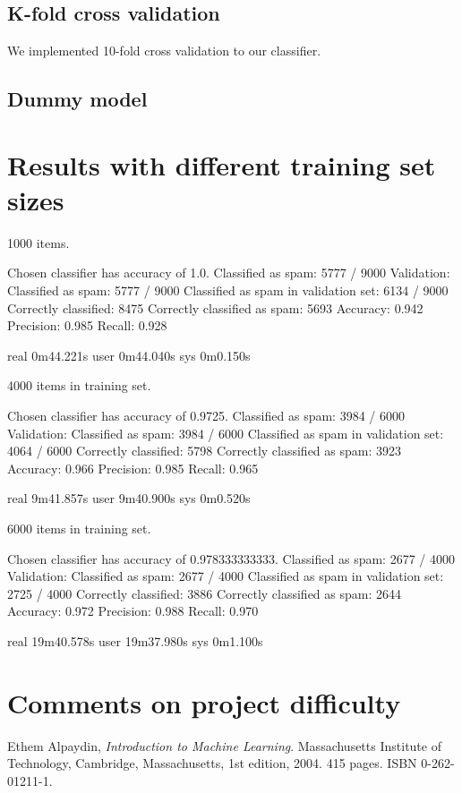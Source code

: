 \documentclass[a4paper,10pt]{article}
\begin{document}
\subsection*{K-fold cross validation}

We implemented 10-fold cross validation to our classifier.

\subsection*{Dummy model}


\section{Results with different training set sizes}

1000 items.

Chosen classifier has accuracy of 1.0.
Classified as spam: 5777 / 9000
Validation:
 Classified as spam: 5777 / 9000
 Classified as spam in validation set: 6134 / 9000
 Correctly classified: 8475
 Correctly classified as spam: 5693
 Accuracy: 0.942
 Precision: 0.985
 Recall: 0.928

real	0m44.221s
user	0m44.040s
sys	0m0.150s

4000 items in training set.

Chosen classifier has accuracy of 0.9725.
Classified as spam: 3984 / 6000
Validation:
 Classified as spam: 3984 / 6000
 Classified as spam in validation set: 4064 / 6000
 Correctly classified: 5798
 Correctly classified as spam: 3923
 Accuracy: 0.966
 Precision: 0.985
 Recall: 0.965

real	9m41.857s
user	9m40.900s
sys	0m0.520s

6000 items in training set.

Chosen classifier has accuracy of 0.978333333333.
Classified as spam: 2677 / 4000
Validation:
 Classified as spam: 2677 / 4000
 Classified as spam in validation set: 2725 / 4000
 Correctly classified: 3886
 Correctly classified as spam: 2644
 Accuracy: 0.972
 Precision: 0.988
 Recall: 0.970

real	19m40.578s
user	19m37.980s
sys	0m1.100s

\newpage
\section*{Comments on project difficulty}



\begin{thebibliography}{9}
  Ethem Alpaydin,
  \emph{Introduction to Machine Learning}.
  Massachusetts Institute of Technology, Cambridge, Massachusetts,
  1st edition,
  2004. 415 pages. ISBN 0-262-01211-1.
\end{thebibliography}
\end{document}
